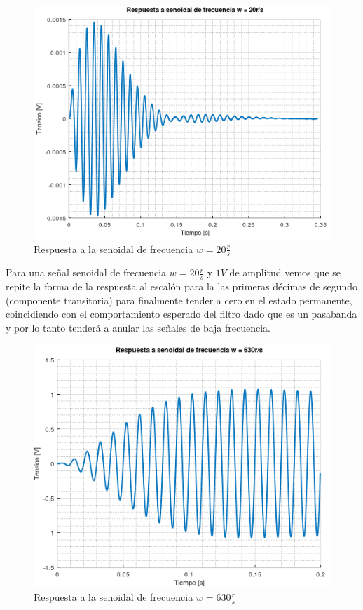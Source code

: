 \documentclass[11pt,a4paper]{report}
\begin{document}
\begin{figure}[h!]
\includegraphics[scale=0.96]{RtaSenoidalBajo.png}
\caption{Respuesta a la senoidal de frecuencia $w = 20\frac{r}{s}$}
\end{figure}

Para una señal senoidal de frecuencia $w = 20\frac{r}{s}$ y $1V$ de amplitud vemos que se repite la forma de la respuesta al escalón para la las primeras décimas de segundo (componente transitoria) para finalmente tender a cero en el estado permanente, coincidiendo con el comportamiento esperado del filtro dado que es un pasabanda y por lo tanto tenderá a anular las señales de baja frecuencia.

\newpage
\begin{figure}[h!]
\includegraphics[scale=1]{RtaSenoidalMedio.png}
\caption{Respuesta a la senoidal de frecuencia $w = 630\frac{r}{s}$}
\end{figure}
\end{document}
